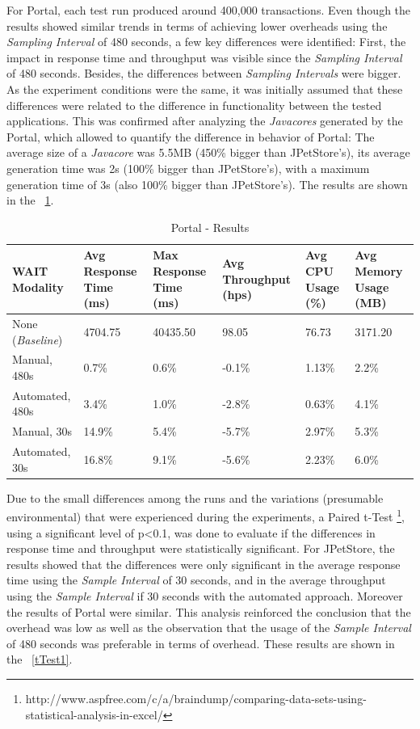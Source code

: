 \documentclass[runningheads,a4paper]{llncs}
\begin{document}
For Portal, each test run produced around 400,000 transactions. Even
though the results showed similar trends in terms of achieving lower overheads using the \emph{Sampling Interval}
of 480 seconds, a few key differences were identified: First, the impact in
response time and throughput was visible since the \emph{Sampling Interval} of
480 seconds. Besides, the differences between \emph{Sampling Intervals} were
bigger. As the experiment conditions were the same, it was initially assumed
that these differences were related to the difference in functionality between
the tested applications. This was confirmed after analyzing the \emph{Javacores}
generated by the Portal, which allowed to quantify the difference in behavior of
Portal: The average size of a \emph{Javacore} was 5.5MB (450\% bigger than JPetStore's), its average
generation time was 2s (100\% bigger than JPetStore's), with a maximum
generation time of 3s (also 100\% bigger than JPetStore's). The results are
shown in the \tablename ~\ref{Portal1}.

\begin{table}[!h]
\caption{Portal - Results}
\label{Portal1}
\centering
\begin{tabular}{p{}|p{}|p{}|p{}|p{}|p{}}
\hline
\bfseries WAIT Modality & \bfseries Avg Response Time (ms)& \bfseries Max
Response Time (ms)& \bfseries Avg Throughput (hps)& \bfseries Avg CPU Usage
(\%) & \bfseries Avg Memory Usage (MB)\\
\hline
None (\emph{Baseline}) 	& 4704.75	& 40435.50	& 98.05 	& 76.73 	& 3171.20\\
Manual, 480s 			& 0.7\% 	& 0.6\%		& -0.1\%	& 1.13\% 	& 2.2\%\\
Automated, 480s 		& 3.4\%		& 1.0\%		& -2.8\% 	& 0.63\% 	& 4.1\%\\
Manual, 30s 			& 14.9\%	& 5.4\%		& -5.7\% 	& 2.97\% 	& 5.3\%\\
Automated, 30s 			& 16.8\%	& 9.1\%		& -5.6\% 	& 2.23\% 	& 6.0\%\\
\hline
\end{tabular}
\end{table}

Due to the small differences among the runs and the variations (presumable
environmental) that were experienced during the experiments, a Paired t-Test
\footnote{http://www.aspfree.com/c/a/braindump/comparing-data-sets-using-statistical-analysis-in-excel/},
using a significant level of p<0.1, was done to evaluate if the differences in response time and throughput were statistically significant. For JPetStore, the
results showed that the differences were only significant in the average
response time using the \emph{Sample Interval} of 30 seconds, and in the
average throughput using the \emph{Sample Interval} if 30 seconds with the
automated approach. Moreover the results of Portal were similar. This analysis
reinforced the conclusion that the overhead was low as well as the observation
that the usage of the \emph{Sample Interval} of 480 seconds was preferable in
terms of overhead. These results are shown in the \tablename ~\ref{tTest1}.
\end{document}
